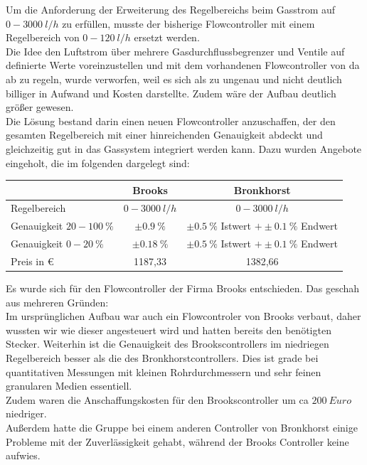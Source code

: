Um die Anforderung der Erweiterung des Regelbereichs beim Gasstrom auf $\SI{0} - \SI{3000}{l/h}$ zu erfüllen, musste der bisherige Flowcontroller mit einem Regelbereich von $\SI{0} - \SI{120}{l/h}$ ersetzt werden. \\
Die Idee den Luftstrom über mehrere Gasdurchflussbegrenzer und Ventile auf definierte Werte voreinzustellen und mit dem vorhandenen Flowcontroller von da ab zu regeln, wurde verworfen, weil es sich als zu ungenau und nicht deutlich billiger in Aufwand und Kosten darstellte. Zudem wäre der Aufbau deutlich größer gewesen. \\
Die Lösung bestand darin einen neuen Flowcontroller anzuschaffen, der den gesamten Regelbereich mit einer hinreichenden Genauigkeit abdeckt und gleichzeitig gut in das Gassystem integriert werden kann. Dazu wurden Angebote eingeholt, die im folgenden dargelegt sind:

\begin{tabular}{|l|c|c|}
	\hline  & Brooks & Bronkhorst \\ 
	\hline Regelbereich & $\SI{0} - \SI{3000}{l/h}$ & $\SI{0} - \SI{3000}{l/h}$ \\ 
	\hline Genauigkeit $20 - \SI{100}{\%}$ & $\pm \SI{0,9}{\%}$ & $\pm \SI{0,5}{\%}$ Istwert $+ \pm \SI{0,1}{\%}$ Endwert\\ 
	\hline Genauigkeit $0 - \SI{20}{\%}$ & $\pm \SI{0,18}{\%}$ & $\pm \SI{0,5}{\%}$ Istwert $+ \pm \SI{0,1}{\%}$ Endwert \\ 
	\hline Preis in \euro & 1187,33 & 1382,66 \\ 
	\hline 
\end{tabular} 

\vspace{0,5cm}

Es wurde sich für den Flowcontroller der Firma Brooks entschieden. Das geschah aus mehreren Gründen: \\
Im ursprünglichen Aufbau war auch ein Flowcontroler von Brooks verbaut, daher wussten wir wie dieser angesteuert wird und hatten bereits den benötigten Stecker. Weiterhin ist die Genauigkeit des Brookscontrollers im niedriegen Regelbereich besser als die des Bronkhorstcontrollers. Dies ist grade bei quantitativen Messungen mit kleinen Rohrdurchmessern und sehr feinen granularen Medien essentiell. \\
Zudem waren die Anschaffungskosten für den Brookscontroller um ca $\SI{200}{Euro}$ niedriger.\\
Außerdem hatte die Gruppe bei einem anderen Controller von Bronkhorst einige Probleme mit der Zuverlässigkeit gehabt, während der Brooks Controller keine aufwies.


